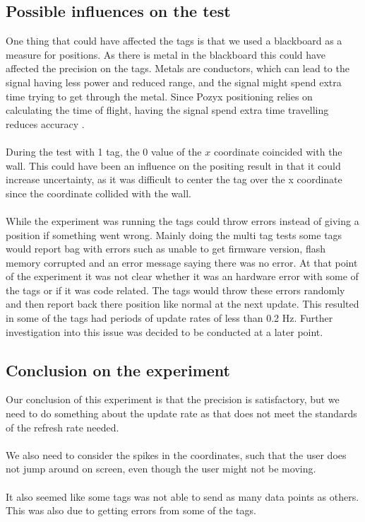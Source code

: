 \subsection{Possible influences on the test}
One thing that could have affected the tags is that we used a blackboard as a measure for positions. 
As there is metal in the blackboard this could have affected the precision on the tags.
Metals are conductors, which can lead to the signal having less power and reduced range, and the signal might spend extra time trying to get through the metal.
Since Pozyx positioning relies on calculating the time of flight, having the signal spend extra time travelling reduces accuracy \cite{pozyx-UWBObstacles}. 
\\\\
During the test with 1 tag, the 0 value of the $x$ coordinate coincided with the wall. 
This could have been an influence on the positing result in that it could increase uncertainty, as it was difficult to center the tag over the x coordinate since the coordinate collided with the wall.
\\\\
While the experiment was running the tags could throw errors instead of giving a position if something went wrong.
Mainly doing the multi tag tests some tags would report bag with errors such as unable to get firmware version, flash memory corrupted and an error message saying there was no error.
At that point of the experiment it was not clear whether it was an hardware error with some of the tags or if it was code related.
The tags would throw these errors randomly and then report back there position like normal at the next update.
This resulted in some of the tags had periods of update rates of less than 0.2 Hz.
Further investigation into this issue was decided to be conducted at a later point.

\subsection{Conclusion on the experiment}
Our conclusion of this experiment is that the precision is satisfactory, but we need to do something about the update rate as that does not meet the standards of the refresh rate needed.
\\\\
We also need to consider the spikes in the coordinates, such that the user does not jump around on screen, even though the user might not be moving.
\\\\
It also seemed like some tags was not able to send as many data points as others. This was also due to getting errors from some of the tags.
